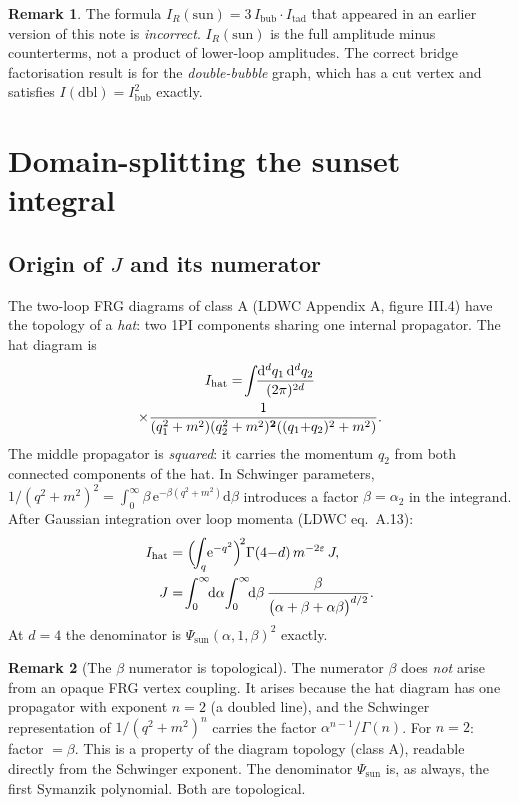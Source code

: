 \documentclass[10pt,a4paper,twocolumn]{article}
\theoremstyle{plain}
\theoremstyle{definition}
\newtheorem{remark}{Remark}
\newcommand{\dd}{\mathrm{d}}
\newcommand{\ee}{\mathrm{e}}
\renewcommand{\Psi}{\varPsi}
\newcommand{\eps}{\varepsilon}
\begin{document}
\begin{remark}
  The formula $I_R(\text{sun}) = 3\,I_{\text{bub}}\cdot I_{\text{tad}}$
  that appeared in an earlier version of this note is \emph{incorrect}.
  $I_R(\text{sun})$ is the full amplitude minus counterterms, not a
  product of lower-loop amplitudes.  The correct bridge factorisation
  result is for the \emph{double-bubble} graph, which has a cut vertex
  and satisfies $I(\text{dbl}) = I_{\text{bub}}^2$ exactly.
\end{remark}

\section{Domain-splitting the sunset integral}
\label{sec:jsplit}

\subsection{Origin of $J$ and its numerator}

The two-loop FRG diagrams of class A (LDWC Appendix A, figure III.4)
have the topology of a \emph{hat}: two 1PI components sharing one
internal propagator.  The hat diagram is
\begin{multline}\label{eq:hat}
  I_{\rm hat}
  = \!\int\!\!\frac{\dd^dq_1\,\dd^dq_2}{(2\pi)^{2d}}\\
  \times\frac{1}{(q_1^2+m^2)(q_2^2+m^2)^{\mathbf{2}}((q_1{+}q_2)^2+m^2)}.
\end{multline}
The middle propagator is \emph{squared}: it carries the momentum
$q_2$ from both connected components of the hat.
In Schwinger parameters, $1/(q^2+m^2)^2 = \int_0^\infty\beta\,
\ee^{-\beta(q^2+m^2)}\dd\beta$ introduces a factor $\beta = \alpha_2$
in the integrand.  After Gaussian integration over loop momenta
(LDWC eq.~A.13):
\begin{align}\label{eq:A13}
  I_{\rm hat}
  &= \Bigl(\!\int_q\!\ee^{-q^2}\Bigr)^{\!2}\Gamma(4{-}d)\,m^{-2\eps}\,J,\\
  J &= \!\int_0^\infty\!\!\dd\alpha\!\int_0^\infty\!\!\dd\beta\,
    \frac{\beta}{\bigl(\alpha+\beta+\alpha\beta\bigr)^{d/2}}.\notag
\end{align}
At $d=4$ the denominator is $\Psi_{\text{sun}}(\alpha,1,\beta)^2$
exactly.

\begin{remark}[The $\beta$ numerator is topological]
The numerator $\beta$ does \emph{not} arise from an opaque FRG
vertex coupling.  It arises because the hat diagram has one
propagator with exponent $n=2$ (a doubled line), and the Schwinger
representation of $1/(q^2+m^2)^n$ carries the factor
$\alpha^{n-1}/\Gamma(n)$.
For $n=2$: factor $= \beta$.  This is a property of the diagram
topology (class A), readable directly from the Schwinger exponent.
The denominator $\Psi_{\text{sun}}$ is, as always, the first
Symanzik polynomial.  Both are topological.
\end{remark}
\end{document}
